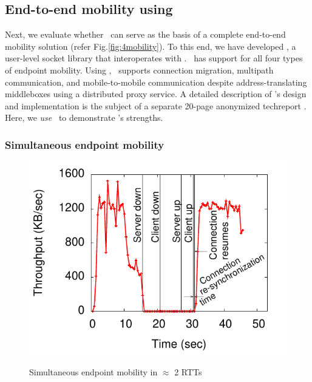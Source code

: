 \subsection{End-to-end mobility using \auspice}
\label{sec:case}

Next, we evaluate whether \auspice\ can serve as the basis of a complete end-to-end mobility solution (refer Fig.\ref{fig:4mobility}). To this end, we have developed \msocket, a user-level socket library that interoperates with \auspice. \msocket\ has support for all four types of endpoint mobility. Using \auspice, \msocket\  supports connection migration, multipath communication, and mobile-to-mobile communication despite address-translating middleboxes using a distributed proxy service. A detailed description of \msocket's design and implementation is the subject of a separate 20-page anonymized techreport \cite{msocketTR}. Here, we {\em use} \msocket\ to demonstrate \auspice's strengths.

\subsubsection{Simultaneous endpoint mobility}

\begin{figure}[htbp]
\begin{center}
\vspace{-1in}
\includegraphics[scale=0.3]{auspice/figure/SimulMig}
\vspace{-1in}
\caption{Simultaneous endpoint mobility in $\approx$ 2 RTTs}
\vspace{-0.2in}
\label{fig:SimulMig}
\end{center}
\end{figure}

